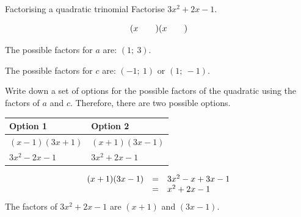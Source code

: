 \begin{wex}
{ 
Factorising a quadratic trinomial 
}
{
Factorise $3{x}^{2}+2x-1$. 
} 
{
\begin{equation*}
(x\phantom{\rule{2.em}{0ex}})(x\phantom{\rule{2.em}{0ex}})
\end{equation*}

The possible factors for $a$ are: $(1;~3)$.\par
The possible factors for $c$ are: $(-1;~1)$ or $(1;~-1)$.\par 
Write down a set of options for the possible factors of the quadratic using the factors of $a$ and $c$.
Therefore, there are two possible options.\par 

\begin{table}[H]
\begin{center}
\label{m39394*id277097}
\noindent

\begin{tabular}{|l|l|}\hline
\textbf{Option 1} &
\textbf{Option 2}%
\\ \hline
$(x-1)(3x+1)$
&
$(x+1)(3x-1)$
\\ \hline
$3{x}^{2}-2x-1$
&
\uline{
$3{x}^{2}+2x-1$
}
\\ \hline
\end{tabular}
\end{center}
\end{table}

\begin{equation*}
\begin{array}{ccl}  
(x+1)(3x-1)& =& 3{x}^{2}-x+3x-1\hfill \\ & =& {x}^{2}+2x-1\end{array}
\end{equation*}
The factors of $3{x}^{2}+2x-1$ are $(x+1)$ and $(3x-1)$.

}
\end{wex}


